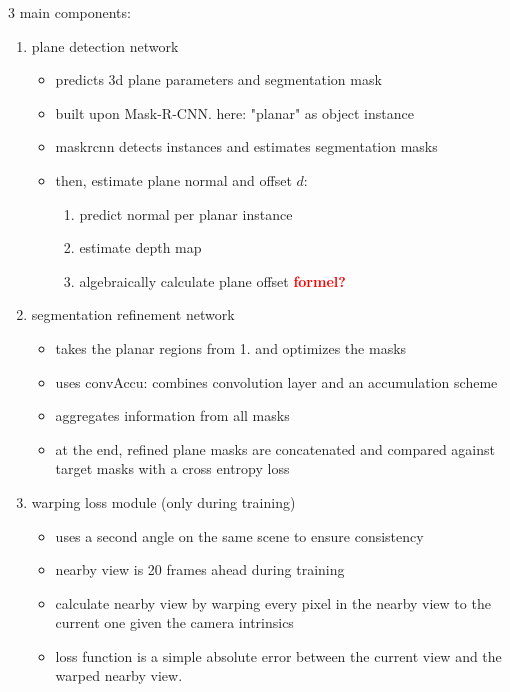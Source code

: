 \documentclass[main.tex]{subfiles}
\begin{document}
3 main components:
\begin{enumerate}
    \item plane detection network
          \begin{itemize}
              \item predicts 3d plane parameters and segmentation mask
              \item built upon Mask-R-CNN. here: "planar" as object instance
              \item maskrcnn detects instances and estimates segmentation masks
              \item then, estimate plane normal and offset $d$:
                    \begin{enumerate}
                        \item predict normal per planar instance
                        \item estimate depth map
                        \item algebraically calculate plane offset \textbf{\textcolor{red}{formel?}}
                    \end{enumerate}
          \end{itemize}
    \item segmentation refinement network
          \begin{itemize}
              \item takes the planar regions from 1. and optimizes the masks
              \item uses convAccu: combines convolution layer and an accumulation scheme
              \item aggregates information from all masks
              \item at the end, refined plane masks are concatenated and compared against target
                    masks with a cross entropy loss
          \end{itemize}
    \item warping loss module (only during training)
          \begin{itemize}
              \item uses a second angle on the same scene to ensure consistency
              \item nearby view is 20 frames ahead during training
              \item calculate nearby view by warping every pixel in the nearby view to the current one
                    given the camera intrinsics
              \item loss function is a simple absolute error between the current view and the
                    warped nearby view.
          \end{itemize}
\end{enumerate}
\end{document}
